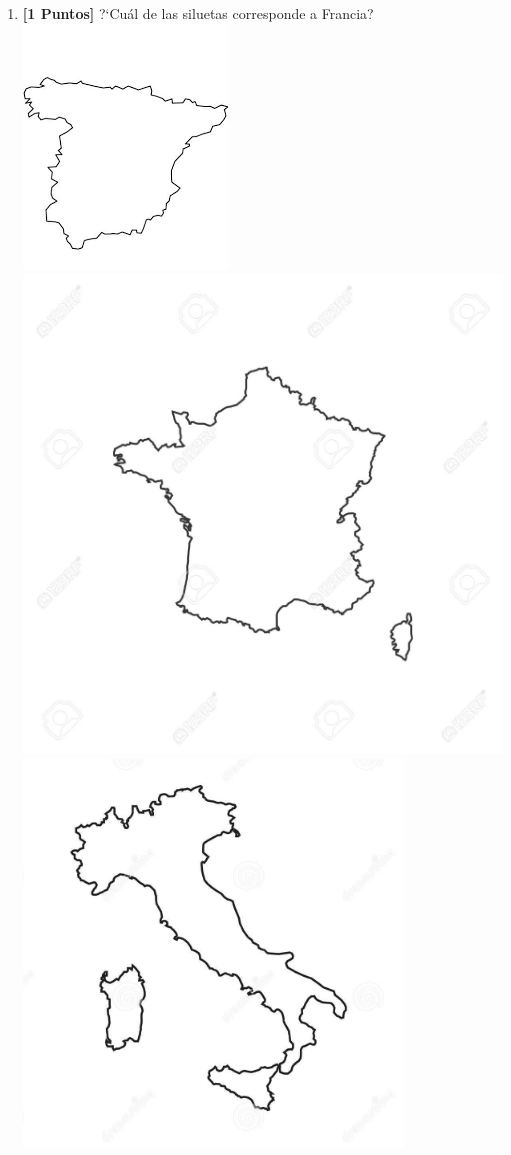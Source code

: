 \documentclass{article}
\begin{document}
\begin{enumerate}
\begin{figure}[h]
\begin{center}
\end{center}
\end{figure}
\item{\bf [1 Puntos]} ?`Cu\'al de las siluetas corresponde a Francia?\\
\includegraphics[scale=0.2]{images2.png}
\includegraphics[scale=0.2]{images3.jpg}
\includegraphics[scale=0.15]{images4.png}

\end{enumerate}
\end{document}

